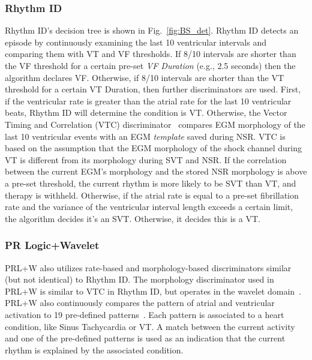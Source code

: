 \subsubsection{Rhythm ID}
Rhythm ID's decision tree is shown in Fig.~\ref{fig:BS_det}.
Rhythm ID detects an episode by continuously examining the last 10 ventricular intervals and comparing them with VT and VF thresholds. 
If 8/10 intervals are shorter than the VF threshold for a certain pre-set \emph{VF Duration} (e.g., 2.5 seconds) then the algorithm declares VF.
Otherwise, if 8/10 intervals are shorter than the VT threshold for a certain VT Duration, then further discriminators are used.
First, if the ventricular rate is greater than the atrial rate for the last 10 ventricular beats, Rhythm ID will determine the condition is VT.
Otherwise, the Vector Timing and Correlation (VTC) discriminator~\cite{VTC} compares EGM morphology of the last 10 ventricular events with an EGM \emph{template} saved during NSR.
VTC is based on the assumption that the EGM morphology of the shock channel during VT is different from its morphology during SVT and NSR.
If the correlation between the current EGM's morphology and the stored NSR morphology is above a pre-set threshold, the current rhythm is more likely to be SVT than VT, and therapy is withheld.
Otherwise, if the atrial rate is equal to a pre-set fibrillation rate and the variance of the ventricular interval length exceeds a certain limit, the algorithm decides it's an SVT. 
Otherwise, it decides this is a VT.

\subsubsection{PR Logic+Wavelet}
PRL+W also utilizes rate-based and morphology-based discriminators similar (but not identical) to Rhythm ID.
The morphology discriminator used in PRL+W  is similar to VTC in Rhythm ID, but operates in the wavelet domain~\cite{Wavelet}.
PRL+W also continuously compares the pattern of atrial and ventricular activation to 19 pre-defined patterns~\cite{Singer}.
Each pattern is associated to a heart condition, like Sinus Tachycardia or VT.
A match between the current activity and one of the pre-defined patterns is used as an indication that the current rhythm is explained by the associated condition.

